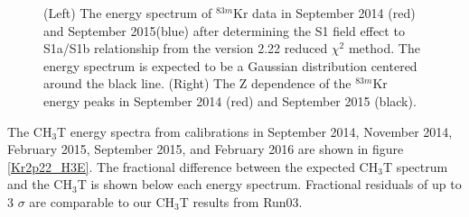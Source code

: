 \documentclass[a4paper,12pt]{article}
\begin{document}
{\begin{figure} [h!]
\centering
{}
\qquad
{}
\caption{ (Left) The energy spectrum of $^{83m}$Kr data in September 2014 (red) and September 2015(blue) after determining the S1 field effect to S1a/S1b relationship from the version 2.22 reduced $\chi^2$ method. The energy spectrum is expected to be a Gaussian distribution centered around the black line.  (Right) The Z dependence of the $^{83m}$Kr energy peaks in September 2014 (red) and September 2015 (black).}
\label{Kr2p22_KrE}
\end{figure}

The CH$_3$T energy spectra from calibrations in September 2014, November 2014, February 2015, September 2015, and February 2016 are shown in figure \ref{Kr2p22_H3E}.  The fractional difference between the expected CH$_3$T spectrum and the CH$_3$T is shown below each energy spectrum.  Fractional residuals of up to 3 $\sigma$ are comparable to our CH$_3$T results from Run03.

\newpage

}
\end{document}
